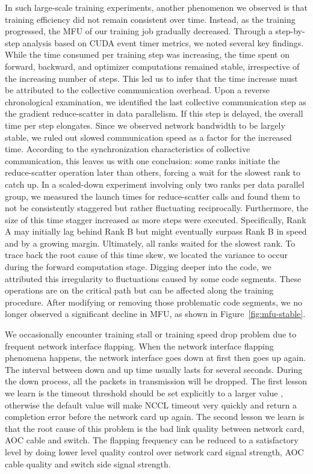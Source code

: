  In such large-scale training experiments, another phenomenon we observed is that training efficiency did not remain consistent over time. Instead, as the training progressed, the MFU of our training job gradually decreased. Through a step-by-step analysis based on CUDA event timer metrics, we noted several key findings. While the time consumed per training step was increasing, the time spent on forward, backward, and optimizer computations remained stable, irrespective of the increasing number of steps. This led us to infer that the time increase must be attributed to the collective communication overhead. Upon a reverse chronological examination, we identified the last collective communication step as the gradient reduce-scatter in data parallelism. If this step is delayed, the overall time per step elongates. Since we observed network bandwidth to be largely stable, we ruled out slowed communication speed as a factor for the increased time. According to the synchronization characteristics of collective communication, this leaves us with one conclusion: some ranks initiate the reduce-scatter operation later than others, forcing a wait for the slowest rank to catch up. In a scaled-down experiment involving only two ranks per data parallel group, we measured the launch times for reduce-scatter calls and found them to not be consistently staggered but rather fluctuating reciprocally. Furthermore, the size of this time stagger increased as more steps were executed. Specifically, Rank A may initially lag behind Rank B but might eventually surpass Rank B in speed and by a growing margin. Ultimately, all ranks waited for the slowest rank. To trace back the root cause of this time skew, we located the variance to occur during the forward computation stage. Digging deeper into the code, we attributed this irregularity to fluctuations caused by 
some code segments.  These operations are on the critical path but can be affected along the training procedure. After modifying or removing those problematic code segments, we no longer observed a significant decline in MFU, as shown in Figure~\ref{fig:mfu-stable}.



 We occasionally encounter training stall or training speed drop problem due to frequent network interface flapping. When the network interface flapping phenomena happens, the network interface goes down at first then goes up again. The interval between down and up time usually lasts for several seconds. During the down process, all the packets in transmission will be dropped. The first lesson we learn is the timeout threshold should be set explicitly to a larger value , otherwise the default value will make NCCL timeout very quickly and return a completion error before the network card up again. The second lesson we learn is that the root cause of this problem is the bad link quality between network card, AOC cable and switch. The flapping frequency can be reduced to a satisfactory level by doing lower level quality control over network card signal strength, AOC cable quality and switch side signal strength. 
